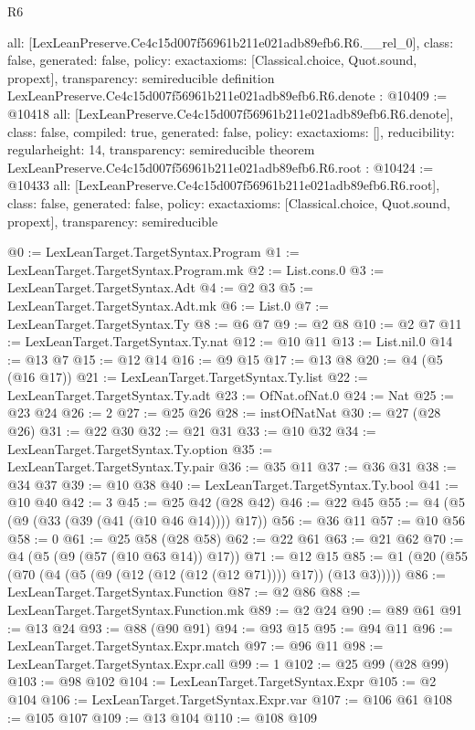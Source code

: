 \begin{lexlean}{R6}
\begin{coremodule}
{  all: [LexLeanPreserve.Ce4c15d007f56961b211e021adb89efb6.R6.__rel_0],
  class: false,
  generated: false,
  policy: exact{axioms: [Classical.choice, Quot.sound, propext]},
  transparency: semireducible
}
definition LexLeanPreserve.Ce4c15d007f56961b211e021adb89efb6.R6.denote : @10409 := @10418 {
  all: [LexLeanPreserve.Ce4c15d007f56961b211e021adb89efb6.R6.denote],
  class: false,
  compiled: true,
  generated: false,
  policy: exact{axioms: []},
  reducibility: regular{height: 14},
  transparency: semireducible
}
theorem LexLeanPreserve.Ce4c15d007f56961b211e021adb89efb6.R6.root : @10424 := @10433 {
  all: [LexLeanPreserve.Ce4c15d007f56961b211e021adb89efb6.R6.root],
  class: false,
  generated: false,
  policy: exact{axioms: [Classical.choice, Quot.sound, propext]},
  transparency: semireducible
}

@0 := LexLeanTarget.TargetSyntax.Program
@1 := LexLeanTarget.TargetSyntax.Program.mk
@2 := List.cons.{0}
@3 := LexLeanTarget.TargetSyntax.Adt
@4 := @2 @3
@5 := LexLeanTarget.TargetSyntax.Adt.mk
@6 := List.{0}
@7 := LexLeanTarget.TargetSyntax.Ty
@8 := @6 @7
@9 := @2 @8
@10 := @2 @7
@11 := LexLeanTarget.TargetSyntax.Ty.nat
@12 := @10 @11
@13 := List.nil.{0}
@14 := @13 @7
@15 := @12 @14
@16 := @9 @15
@17 := @13 @8
@20 := @4 (@5 (@16 @17))
@21 := LexLeanTarget.TargetSyntax.Ty.list
@22 := LexLeanTarget.TargetSyntax.Ty.adt
@23 := OfNat.ofNat.{0}
@24 := Nat
@25 := @23 @24
@26 := 2
@27 := @25 @26
@28 := instOfNatNat
@30 := @27 (@28 @26)
@31 := @22 @30
@32 := @21 @31
@33 := @10 @32
@34 := LexLeanTarget.TargetSyntax.Ty.option
@35 := LexLeanTarget.TargetSyntax.Ty.pair
@36 := @35 @11
@37 := @36 @31
@38 := @34 @37
@39 := @10 @38
@40 := LexLeanTarget.TargetSyntax.Ty.bool
@41 := @10 @40
@42 := 3
@45 := @25 @42 (@28 @42)
@46 := @22 @45
@55 := @4 (@5 (@9 (@33 (@39 (@41 (@10 @46 @14)))) @17))
@56 := @36 @11
@57 := @10 @56
@58 := 0
@61 := @25 @58 (@28 @58)
@62 := @22 @61
@63 := @21 @62
@70 := @4 (@5 (@9 (@57 (@10 @63 @14)) @17))
@71 := @12 @15
@85 := @1 (@20 (@55 (@70 (@4 (@5 (@9 (@12 (@12 (@12 (@12 @71)))) @17)) (@13 @3)))))
@86 := LexLeanTarget.TargetSyntax.Function
@87 := @2 @86
@88 := LexLeanTarget.TargetSyntax.Function.mk
@89 := @2 @24
@90 := @89 @61
@91 := @13 @24
@93 := @88 (@90 @91)
@94 := @93 @15
@95 := @94 @11
@96 := LexLeanTarget.TargetSyntax.Expr.match
@97 := @96 @11
@98 := LexLeanTarget.TargetSyntax.Expr.call
@99 := 1
@102 := @25 @99 (@28 @99)
@103 := @98 @102
@104 := LexLeanTarget.TargetSyntax.Expr
@105 := @2 @104
@106 := LexLeanTarget.TargetSyntax.Expr.var
@107 := @106 @61
@108 := @105 @107
@109 := @13 @104
@110 := @108 @109

\end{coremodule}
\end{lexlean}
